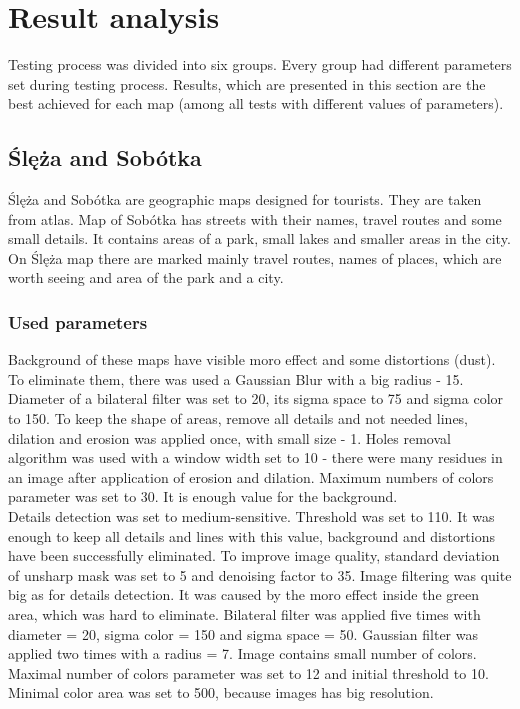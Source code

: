 \documentclass[a4paper,onecolumn,oneside,12pt]{memoir}
\begin{document}
\section{Result analysis}

Testing process was divided into six groups. Every group had different parameters set during testing
process. Results, which are presented in this section are the best achieved for each map (among
all tests with different values of parameters).

\subsection{Ślęża and Sobótka}

Ślęża and Sobótka are geographic maps designed for tourists. They are taken from atlas. Map of 
Sobótka has streets with their names, travel routes and some small details. It contains areas of a
park, small lakes and smaller areas in the city. On Ślęża map there are marked mainly travel routes,
names of places, which are worth seeing and area of the park and a city.

\subsubsection{Used parameters}

Background of these maps have visible moro effect and some distortions (dust). To eliminate them,
there was used a Gaussian Blur with a big radius - 15. Diameter of a bilateral filter was set to
20, its sigma space to 75 and sigma color to 150. To keep the shape of areas, remove all details
and not needed lines, dilation and erosion was applied once, with small size - 1. Holes removal
algorithm was used with a window width set to 10 - there were many residues in an image after
application of erosion and dilation. Maximum numbers of colors parameter was set to 30. It is enough
value for the background. \\

Details detection was set to medium-sensitive. Threshold was set to 110. It was enough to keep all
details and lines with this value, background and distortions have been successfully eliminated.
To improve image quality, standard deviation of unsharp mask was set to 5 and denoising factor to
35. Image filtering was quite big as for details detection. It was caused by the moro effect inside
the green area, which was hard to eliminate. Bilateral filter was applied five times with diameter =
20, sigma color = 150 and sigma space = 50. Gaussian filter was applied two times with a radius = 7.
Image contains small number of colors. Maximal number of colors parameter was set to 12 and initial
threshold to 10. Minimal color area was set to 500, because images has big resolution.
\end{document}
